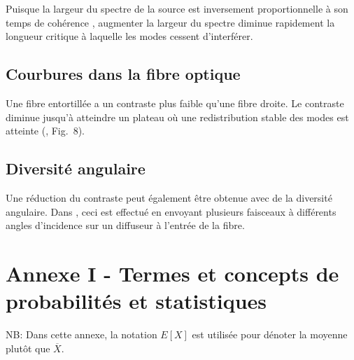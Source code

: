 \documentclass{article}       %
\begin{document}
Puisque la largeur du spectre de la source est inversement proportionnelle à son temps de cohérence \cite{Coherence}, augmenter la largeur du spectre diminue rapidement la longueur critique à laquelle les modes cessent d'interférer.

\subsection{Courbures dans la fibre optique}

Une fibre entortillée a un contraste plus faible qu'une fibre droite. Le contraste diminue jusqu'à atteindre un plateau où une redistribution stable des modes est atteinte (\cite{FiberStats}, Fig.~8).

\subsection{Diversité angulaire}

Une réduction du contraste peut également être obtenue avec de la diversité angulaire. Dans \cite{Angular}, ceci est effectué en envoyant plusieurs faisceaux à différents angles d'incidence sur un diffuseur à l'entrée de la fibre.



\newpage

\section*{Annexe I - Termes et concepts de probabilités et statistiques}
\label{AnnexeI}

NB: Dans cette annexe, la notation $E[X]$ est utilisée pour dénoter la moyenne plutôt que $\overline{X}$.
\end{document}
